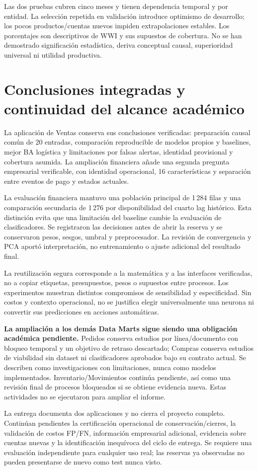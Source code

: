 Las dos pruebas cubren cinco meses y tienen dependencia temporal y por entidad. La selección repetida en validación introduce optimismo de desarrollo; los pocos productos/cuentas nuevos impiden extrapolaciones estables. Los porcentajes son descriptivos de WWI y sus supuestos de cobertura. No se han demostrado significación estadística, deriva conceptual causal, superioridad universal ni utilidad productiva.

\section{Conclusiones integradas y continuidad del alcance académico}
La aplicación de Ventas conserva sus conclusiones verificadas: preparación causal común de 20 entradas, comparación reproducible de modelos propios y baselines, mejor BA logística y limitaciones por falsas alertas, identidad provisional y cobertura asumida. La ampliación financiera añade una segunda pregunta empresarial verificable, con identidad operacional, 16 características y separación entre eventos de pago y estados actuales.

La evaluación financiera mantuvo una población principal de 1\,284 filas y una comparación secundaria de 1\,276 por disponibilidad del cuarto lag histórico. Esta distinción evita que una limitación del baseline cambie la evaluación de clasificadores. Se registraron las decisiones antes de abrir la reserva y se conservaron pesos, sesgos, umbral y preprocesador. La revisión de convergencia y PCA aportó interpretación, no entrenamiento o ajuste adicional del resultado final.

La reutilización segura corresponde a la matemática y a las interfaces verificadas, no a copiar etiquetas, presupuestos, pesos o supuestos entre procesos. Los experimentos muestran distintos compromisos de sensibilidad y especificidad. Sin costos y contexto operacional, no se justifica elegir universalmente una neurona ni convertir sus predicciones en acciones automáticas.

\textbf{La ampliación a los demás Data Marts sigue siendo una obligación académica pendiente.} Pedidos conserva estudios por línea/documento con bloqueo temporal y un objetivo de retraso descartado; Compras conserva estudios de viabilidad sin dataset ni clasificadores aprobados bajo su contrato actual. Se describen como investigaciones con limitaciones, nunca como modelos implementados. Inventario/Movimientos continúa pendiente, así como una revisión final de procesos bloqueados si se obtiene evidencia nueva. Estas actividades no se ejecutaron para ampliar el informe.

La entrega documenta dos aplicaciones y no cierra el proyecto completo. Continúan pendientes la certificación operacional de conservación/cierres, la validación de costos FP/FN, información empresarial adicional, evidencia sobre cuentas nuevas y la identificación inequívoca del ciclo de entrega. Se requiere una evaluación independiente para cualquier uso real; las reservas ya observadas no pueden presentarse de nuevo como test nunca visto.
